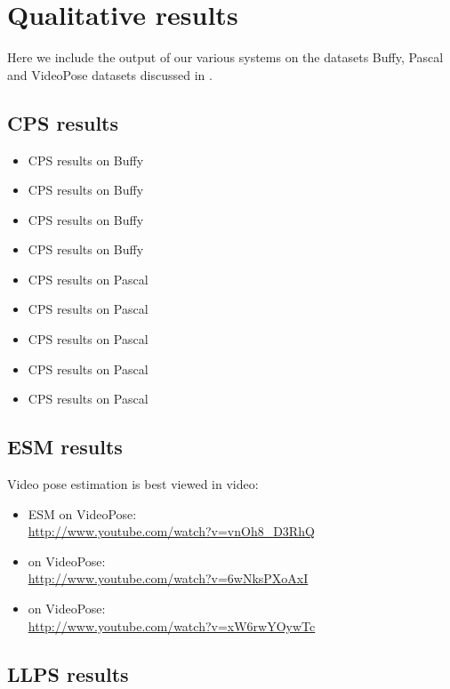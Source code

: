 \chapter{Qualitative results}

Here we include the output of our various systems on the datasets Buffy, Pascal 
and VideoPose datasets discussed in .

\section{CPS results}
\begin{itemize}
\item CPS results on Buffy 
\item CPS results on Buffy 
\item CPS results on Buffy 
\item CPS results on Buffy 

\item CPS results on Pascal 
\item CPS results on Pascal 
\item CPS results on Pascal 
\item CPS results on Pascal 
\item CPS results on Pascal 
\end{itemize}

\section{ESM results}

Video pose estimation is best viewed in video:  

\begin{itemize}
\item ESM on VideoPose: \\
\url{http://www.youtube.com/watch?v=vnOh8_D3RhQ}
\item \citet{deva2011} on VideoPose: \\
\url{http://www.youtube.com/watch?v=6wNksPXoAxI}
\item \citet{eichner09} on VideoPose: \\
\url{http://www.youtube.com/watch?v=xW6rwYOywTc}
\end{itemize}

\section{LLPS results}

